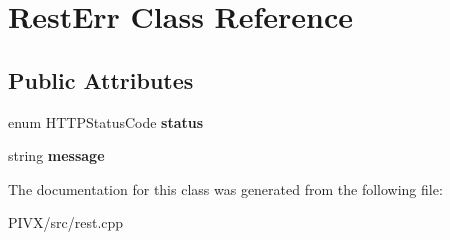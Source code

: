\hypertarget{class_rest_err}{}\section{Rest\+Err Class Reference}
\label{class_rest_err}
\subsection*{Public Attributes}
\begin{DoxyCompactItemize}
\item 
\mbox{\label{class_rest_err_a4d255c35df09d8909dcc4014bfbe106b}} 
enum H\+T\+T\+P\+Status\+Code {\bfseries status}
\item 
\mbox{\label{class_rest_err_a0235d86cbc21e56c7c635a7fb0d7a52d}} 
string {\bfseries message}
\end{DoxyCompactItemize}


The documentation for this class was generated from the following file\+:\begin{DoxyCompactItemize}
\item 
P\+I\+V\+X/src/rest.\+cpp\end{DoxyCompactItemize}
